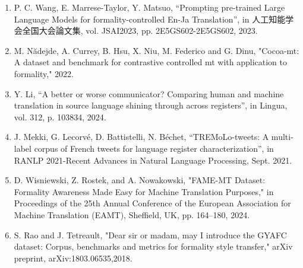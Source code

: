\documentclass[fleqn,moreauthors,10pt]{ds_report}
\begin{document}
		
		
		\renewcommand{\labelenumi}{[\theenumi]}
		\begin{enumerate}
			\item  P. C. Wang, E. Marrese-Taylor, Y. Matsuo, “Prompting pre-trained Large Language Models for formality-controlled En-Ja Translation”, in 人工知能学会全国大会論文集, vol. JSAI2023, pp. 2E5GS602-2E5GS602, 2023.
			\item M. N\u{a}dejde, A. Currey, B. Hsu, X. Niu, M. Federico and G. Dinu, "Cocoa-mt: A dataset and benchmark for contrastive controlled mt with application to formality," 2022.
			\item Y. Li, “A better or worse communicator? Comparing human and machine translation in source language shining through across registers”, in Lingua, vol. 312, p. 103834, 2024.
			\item J. Mekki, G. Lecorvé, D. Battistelli, N. Béchet, “TREMoLo-tweets: A multi-label corpus of French tweets for language register characterization”, in RANLP 2021-Recent Advances in Natural Language Processing, Sept. 2021.
			\item D. Wisniewski, Z. Rostek, and A. Nowakowski, "FAME-MT Dataset: Formality Awareness Made Easy for Machine Translation Purposes," in Proceedings of the 25th Annual Conference of the European Association for Machine Translation (EAMT), Sheffield, UK, pp. 164–180, 2024.
			\item S. Rao and J. Tetreault, "Dear sir or madam, may I introduce the GYAFC dataset: Corpus, benchmarks and metrics for formality style transfer," arXiv preprint, arXiv:1803.06535,2018.
		\end{enumerate}
		
		
	
\end{document}
